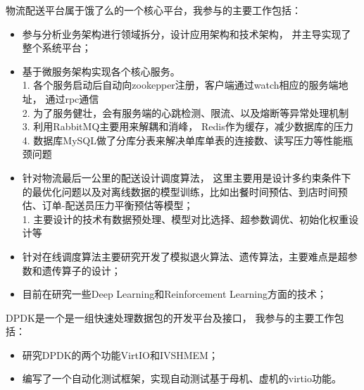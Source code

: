 \documentclass{resume}
\begin{document}
\begin{onehalfspacing}
	物流配送平台属于饿了么的一个核心平台，我参与的主要工作包括：
\begin{itemize}
 \item 参与分析业务架构进行领域拆分，设计应用架构和技术架构， 并主导实现了整个系统平台；
  \item 基于微服务架构实现各个核心服务。\\1.  各个服务启动后自动向zookepper注册，客户端通过watch相应的服务端地址， 通过rpc通信 \\2. 为了服务健壮，会有服务端的心跳检测、限流、以及熔断等异常处理机制
  \\3.  利用RabbitMQ主要用来解耦和消峰， Redis作为缓存，减少数据库的压力
  \\4.  数据库MySQL做了分库分表来解决单库单表的连接数、读写压力等性能瓶颈问题
  \item 针对物流最后一公里的配送设计调度算法， 这里主要用是设计多约束条件下的最优化问题以及对离线数据的模型训练，比如出餐时间预估、到店时间预估、订单-配送员压力平衡预估等模型；
  \\ 1.  主要设计的技术有数据预处理、模型对比选择、超参数调优、初始化权重设计等
  \item 针对在线调度算法主要研究开发了模拟退火算法、遗传算法，主要难点是超参数和遗传算子的设计；
  \item 目前在研究一些Deep Learning和Reinforcement Learning方面的技术；
\end{itemize}
\end{onehalfspacing}

\begin{onehalfspacing}
DPDK是一个是一组快速处理数据包的开发平台及接口， 我参与的主要工作包括：
\begin{itemize}
  \item 研究DPDK的两个功能VirtIO和IVSHMEM；
  \item 编写了一个自动化测试框架，实现自动测试基于母机、虚机的virtio功能。
\end{itemize}
\end{onehalfspacing}

\end{document}
